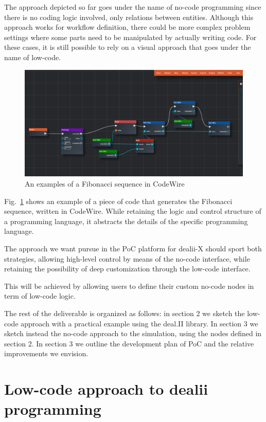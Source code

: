 \documentclass[a4paper,12pt]{article}
\begin{document}
The approach depicted so far goes under the name of no-code programming since there is no coding logic involved, only relations between entities. Although this approach works for workflow definition, there could be more complex problem settings where some parts need to be manipulated by actually writing code. For these cases, it is still possible to rely on a visual approach that goes under the name of low-code. 
\begin{figure}
\includegraphics[width=400pt]{lowcode.png}
\caption{An examples of a Fibonacci sequence in CodeWire}
\label{lowcode}
\end{figure}
Fig.~\ref{lowcode} shows an example of a piece of code that generates the Fibonacci sequence, written in CodeWire. While retaining the logic and control structure of a programming language, it abstracts the details of the specific programming language. 

The approach we want pursue in the PoC platform for dealii-X should sport both strategies, allowing high-level control by means of the no-code interface, while retaining the possibility of deep customization through the low-code interface. 

This will be achieved by allowing users to define their custom no-code nodes in term of low-code logic.

The rest of the deliverable is organized as follows: in section 2 we sketch the low-code approach with a practical example using the deal.II library. In section 3 we sketch instead the no-code approach to the simulation, using the nodes defined in section 2. In section 3 we outline the development plan of PoC and the relative improvements we envision. 


\section{\textcolor{EUblue}{Low-code approach to dealii programming}}
\end{document}
